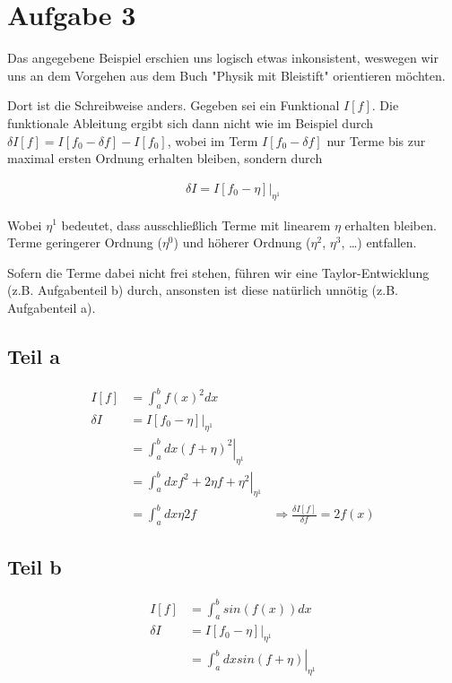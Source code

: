 \documentclass[a4paper,german,12pt,smallheadings]{scrartcl}
\begin{document}
\section*{Aufgabe 3}
Das angegebene Beispiel erschien uns logisch etwas inkonsistent, weswegen wir
uns an dem Vorgehen aus dem Buch "Physik mit Bleistift" orientieren möchten.

Dort ist die Schreibweise anders. Gegeben sei ein Funktional $I[f]$. Die
funktionale Ableitung ergibt sich dann nicht wie im Beispiel durch $\delta I[f]
= I[f_0 - \delta f] - I[f_0]$, wobei im Term $I[f_0 - \delta f]$ nur Terme bis
zur maximal ersten Ordnung erhalten bleiben, sondern durch

\begin{align*}
  \delta I = \left.I[f_0 - \eta]\right|_{\eta^1}
\end{align*}

Wobei $\eta^1$ bedeutet, dass ausschließlich Terme mit linearem $\eta$ erhalten
bleiben. Terme geringerer Ordnung ($\eta^0$) und höherer Ordnung ($\eta^2$,
$\eta^3$, \dots) entfallen.

Sofern die Terme dabei nicht frei stehen, führen wir eine Taylor-Entwicklung
(z.B. Aufgabenteil b) durch, ansonsten ist diese natürlich unnötig (z.B.
Aufgabenteil a).

\subsection*{Teil a}

\begin{align*}
  I[f] &= \int_a^b f(x)^2 dx \\
  \delta I &= \left.I[f_0 - \eta]\right|_{\eta^1} \\
  &=\left.\int_a^b dx (f+\eta)^2 \right|_{\eta^1} \\
  &=\left.\int_a^b dx f^2 + 2 \eta f + \eta^2 \right|_{\eta^1} \\
  &=\int_a^b dx \eta 2 f
  &\Rightarrow \frac{\delta I[f]}{\delta f} = 2f(x)
\end{align*}

\subsection*{Teil b}

\begin{align*}
  I[f] &= \int_a^b sin(f(x)) dx \\
  \delta I &= \left.I[f_0 - \eta]\right|_{\eta^1} \\
  &=\left.\int_a^b dx sin(f+\eta) \right|_{\eta^1}
\end{align*}
\end{document}
